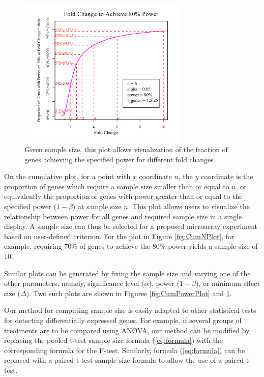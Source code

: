 \documentclass{bioinfo}
\begin{document}
\begin{figure}[h]
  \centerline{\includegraphics*[width=3.2in]{CumFoldChangePlotP.pdf}}
  \caption[Given Sample Size, Fold Change (Effect Size) Necessary to
    Achieving a Specified Power]{Given sample size, this plot allows
    visualization of the fraction of genes achieving the specified
    power for different fold changes.}
  \label{fig:CumFoldChangePlot}
\end{figure}

On the cumulative plot, for a point with $x$ coordinate $n$, the
$y$ coordinate is the proportion of genes which require a sample
size smaller than or equal to $n$, or equivalently the proportion
of genes with power greater than or equal to the specified power
($1-\beta$) at sample size $n$. This plot allows users to
visualize the relationship between power for all genes and
required sample size in a single display.  A sample size can thus
be selected for a proposed microarray experiment based on
user-defined criterion. For the plot in Figure \ref{fig:CumNPlot},
for example, requiring $70\%$ of genes to achieve the $80\%$ power
yields a sample size of 10.

Similar plots can be generated by fixing the sample size and
varying one of the other parameters, namely, significance level
($\alpha$), power ($1-\beta$), or minimum effect size ($\Delta$). Two
such plots are shown in Figures \ref{fig:CumPowerPlot} and
\ref{fig:CumFoldChangePlot}.

Our method for computing sample size is easily adapted to other
statistical tests for detecting differentially expressed genes. For
example, if several groups of treatments are to be compared using
ANOVA, our method can be modified by replacing the pooled t-test
sample size formula (\ref{eq:formula}) with the corresponding
formula for the F-test. Similarly, formula (\ref{eq:formula}) can be
replaced with a paired t-test sample size formula to allow the use
of a paired t-test.
\end{document}
